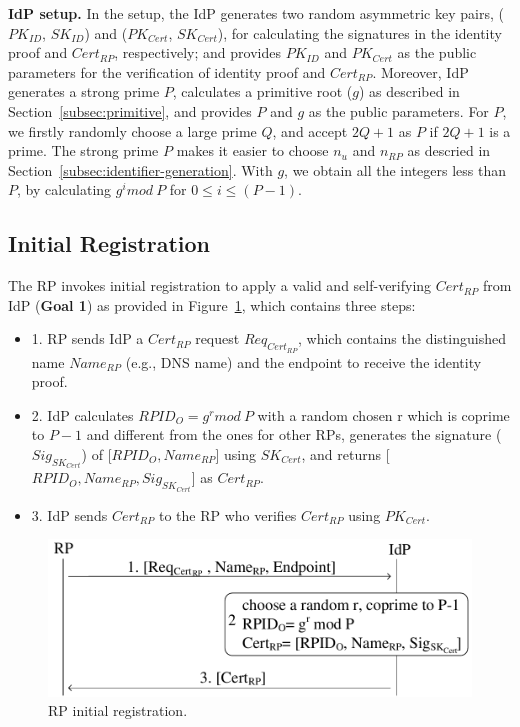 \noindent\textbf{IdP setup.} In the setup, the IdP generates two random asymmetric key pairs, ($PK_{ID}$, $SK_{ID}$) and ($PK_{Cert}$, $SK_{Cert}$), for calculating the signatures in the identity proof and $Cert_{RP}$, respectively; and provides $PK_{ID}$ and $PK_{Cert}$ as the public parameters for the verification of identity proof and $Cert_{RP}$. Moreover, IdP generates a strong prime $P$, calculates  a primitive root ($g$) as described in Section~\ref{subsec:primitive}, and provides $P$ and $g$ as the public parameters. For $P$, we firstly randomly choose a large prime $Q$, and accept  $2Q+1$ as $P$ if $2Q+1$ is a prime. The strong prime $P$ makes it easier to choose $n_{u}$ and $n_{RP}$ as descried in Section~\ref{subsec:identifier-generation}. With $g$, we obtain all the integers less than $P$, by calculating $g^i mod \ P$ for $0 \leq i \leq (P-1)$.

\subsection{Initial Registration}
\label{subsec:intialreg}
The RP invokes initial registration to apply a valid and self-verifying $Cert_{RP}$ from IdP (\textbf{Goal 1}) as provided in Figure~\ref{fig:registration}, which contains three steps:
\begin{itemize}
\item 1. RP sends IdP a $Cert_{RP}$ request $Req_{Cert_{RP}}$, which contains the distinguished name $Name_{RP}$ (e.g., DNS name) and the endpoint to receive the identity proof.
\item 2. IdP calculates $RPID_O = g^r mod \ P$ with a random chosen r which is coprime to $P-1$ and different from the ones for other RPs,  generates the signature ($Sig_{SK_{Cert}}$) of [$RPID_O, Name_{RP}$] using $SK_{Cert}$, and returns [$RPID_O, Name_{RP}, Sig_{SK_{Cert}}$] as $Cert_{RP}$.
\item 3. IdP sends $Cert_{RP}$ to the RP who verifies $Cert_{RP}$ using $PK_{Cert}$.
\end{itemize}

\begin{figure}
  \centering
  \includegraphics[width=\linewidth]{fig/registration.pdf}
  \caption{RP initial registration.}
  \label{fig:registration}
\end{figure}

